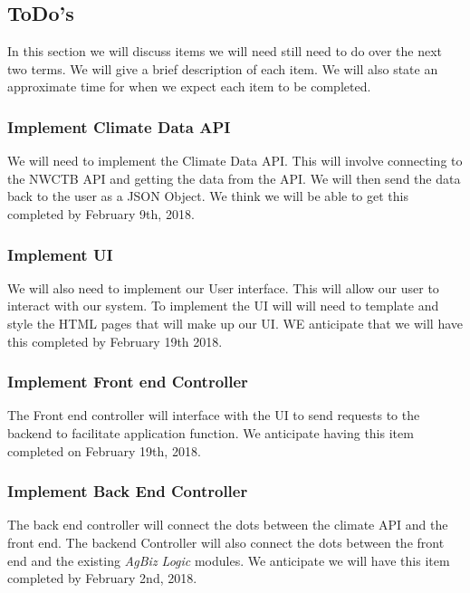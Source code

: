 \documentclass[onecolumn, draftclsnofoot,10pt, compsoc]{article}
\begin{document}
	\subsection{ToDo's}
	    In this section we will discuss items we will need still need to do over the next two terms. We will give a brief description of each item. We will also state an approximate time for when we expect each item to be completed.\\
	    
	    \subsubsection{Implement Climate Data API}
	        We will need to implement the Climate Data API. This will involve connecting to the NWCTB API and getting the data from the API. We will then send the data back to the user as a JSON Object. We think we will be able to get this completed by February 9th, 2018.\\
	    
	    \subsubsection{Implement UI}
	        We will also need to implement our User interface. This will allow our user to interact with our system. To implement the UI will will need to template and style the HTML pages that will make up our UI. WE anticipate that we will have this completed by February 19th 2018.\\
	    
	    \subsubsection{Implement Front end Controller}
	        The Front end controller will interface with the UI to send requests to the backend to facilitate application function. We anticipate having this item completed on February 19th, 2018.\\
	    
	    \subsubsection{Implement Back End Controller}
	        The back end controller will connect the dots between the climate API and the front end. The backend Controller will also connect the dots between the front end and the existing \textit{AgBiz Logic} modules. We anticipate we will have this item completed by February 2nd, 2018.
	    
\end{document}
